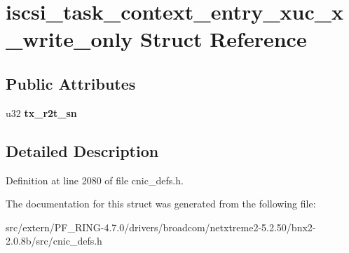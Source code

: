 \hypertarget{structiscsi__task__context__entry__xuc__x__write__only}{
\section{iscsi\_\-task\_\-context\_\-entry\_\-xuc\_\-x\_\-write\_\-only Struct Reference}
\label{structiscsi__task__context__entry__xuc__x__write__only}
}
\subsection*{Public Attributes}
\begin{DoxyCompactItemize}
\item 
\hypertarget{structiscsi__task__context__entry__xuc__x__write__only_a253c19fe172dd657d45821fda8854b8e}{
u32 {\bfseries tx\_\-r2t\_\-sn}}
\label{structiscsi__task__context__entry__xuc__x__write__only_a253c19fe172dd657d45821fda8854b8e}

\end{DoxyCompactItemize}


\subsection{Detailed Description}


Definition at line 2080 of file cnic\_\-defs.h.



The documentation for this struct was generated from the following file:\begin{DoxyCompactItemize}
\item 
src/extern/PF\_\-RING-\/4.7.0/drivers/broadcom/netxtreme2-\/5.2.50/bnx2-\/2.0.8b/src/cnic\_\-defs.h\end{DoxyCompactItemize}
